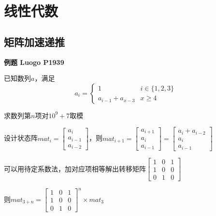 \section{线性代数}

\subsection{矩阵加速递推}

\textbf{例题 Luogo P1939}

已知数列$a$，满足
\[
a_i=\left\{\begin{matrix}
               1 & i\in \{1,2,3\}\\
               a_{i-1}+a_{x-3}& x\ge 4
\end{matrix}\right.
\]

求数列第$n$项对$10^9+7$取模

设计状态阵$mat_i=\begin{bmatrix}
                     a_i \\
                     a_{i-1}\\
                     a_{i-2}
\end{bmatrix}$，则$mat_{i+1}=\begin{bmatrix}a_{i+1}\\a_{i}\\a_{i-1}\end{bmatrix}=\begin{bmatrix}a_{i}+a_{i-2}\\a_{i}\\a_{i-1}\end{bmatrix}$

可以用待定系数法，加对应项相等解出转移矩阵$\begin{bmatrix}1&0&1\\1&0&0\\0&1&0\end{bmatrix}$

则$mat_{3+n}=\begin{bmatrix}1&0&1\\1&0&0\\0&1&0\end{bmatrix}^n\times mat_3$